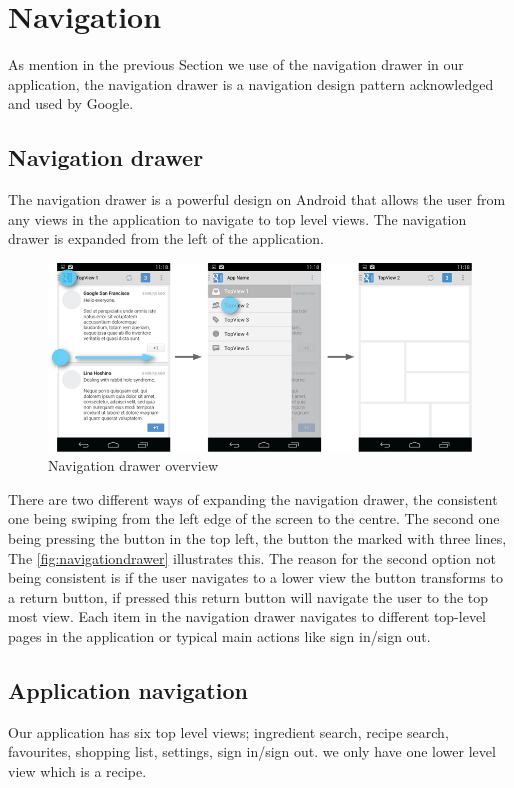 \section{Navigation}\label{sec:navigation}
As mention in the previous Section we use of the navigation drawer in our application, the navigation drawer is a navigation design pattern acknowledged and used by Google.\cite{guidelines-navigationdrawer}
\subsection{Navigation drawer}
The navigation drawer is a powerful design on Android that allows the user from any views in the application to navigate to top level views. The navigation drawer is expanded from the 
left of the application.
\begin{figure}[H]
\centering
\includegraphics[width=0.9\linewidth]{img/screenshots/navigation_drawer_overview.png}
\caption{Navigation drawer overview \cite{guidelines-navigationdrawer}}
\label{fig:navigationdrawer}
\end{figure}
There are two different ways of expanding the navigation drawer, the consistent one being swiping from the left edge of the screen to the centre. 
The second one being pressing the button in the top left, the button the marked with three lines, The \autoref{fig:navigationdrawer} illustrates this. 
The reason for the second option not being consistent is if the user navigates to a lower view the button transforms to a return button, if pressed this return button will navigate the user to the top most view. 
Each item in the navigation drawer navigates to different top-level pages in the application or typical main actions like sign in/sign out.

\subsection{Application navigation}
Our application has six top level views; ingredient search, recipe search, favourites, shopping list, settings, sign in/sign out. we only have one lower level view which is a recipe. 